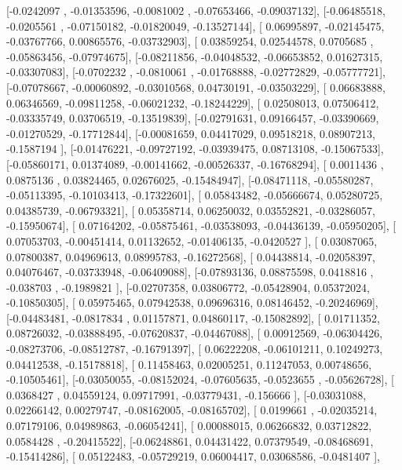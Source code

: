 \documentclass{article}
\begin{document}
       [-0.0242097 , -0.01353596, -0.0081002 , -0.07653466, -0.09037132],
       [-0.06485518, -0.0205561 , -0.07150182, -0.01820049, -0.13527144],
       [ 0.06995897, -0.02145475, -0.03767766,  0.00865576, -0.03732903],
       [ 0.03859254,  0.02544578,  0.0705685 , -0.05863456, -0.07974675],
       [-0.08211856, -0.04048532, -0.06653852,  0.01627315, -0.03307083],
       [-0.0702232 , -0.0810061 , -0.01768888, -0.02772829, -0.05777721],
       [-0.07078667, -0.00060892, -0.03010568,  0.04730191, -0.03503229],
       [ 0.06683888,  0.06346569, -0.09811258, -0.06021232, -0.18244229],
       [ 0.02508013,  0.07506412, -0.03335749,  0.03706519, -0.13519839],
       [-0.02791631,  0.09166457, -0.03390669, -0.01270529, -0.17712844],
       [-0.00081659,  0.04417029,  0.09518218,  0.08907213, -0.1587194 ],
       [-0.01476221, -0.09727192, -0.03939475,  0.08713108, -0.15067533],
       [-0.05860171,  0.01374089, -0.00141662, -0.00526337, -0.16768294],
       [ 0.0011436 ,  0.0875136 ,  0.03824465,  0.02676025, -0.15484947],
       [-0.08471118, -0.05580287, -0.05113395, -0.10103413, -0.17322601],
       [ 0.05843482, -0.05666674,  0.05280725,  0.04385739, -0.06793321],
       [ 0.05358714,  0.06250032,  0.03552821, -0.03286057, -0.15950674],
       [ 0.07164202, -0.05875461, -0.03538093, -0.04436139, -0.05950205],
       [ 0.07053703, -0.00451414,  0.01132652, -0.01406135, -0.0420527 ],
       [ 0.03087065,  0.07800387,  0.04969613,  0.08995783, -0.16272568],
       [ 0.04438814, -0.02058397,  0.04076467, -0.03733948, -0.06409088],
       [-0.07893136,  0.08875598,  0.0418816 , -0.038703  , -0.1989821 ],
       [-0.02707358,  0.03806772, -0.05428904,  0.05372024, -0.10850305],
       [ 0.05975465,  0.07942538,  0.09696316,  0.08146452, -0.20246969],
       [-0.04483481, -0.0817834 ,  0.01157871,  0.04860117, -0.15082892],
       [ 0.01711352,  0.08726032, -0.03888495, -0.07620837, -0.04467088],
       [ 0.00912569, -0.06304426, -0.08273706, -0.08512787, -0.16791397],
       [ 0.06222208, -0.06101211,  0.10249273,  0.04412538, -0.15178818],
       [ 0.11458463,  0.02005251,  0.11247053,  0.00748656, -0.10505461],
       [-0.03050055, -0.08152024, -0.07605635, -0.0523655 , -0.05626728],
       [ 0.0368427 ,  0.04559124,  0.09717991, -0.03779431, -0.156666  ],
       [-0.03031088,  0.02266142,  0.00279747, -0.08162005, -0.08165702],
       [ 0.0199661 , -0.02035214,  0.07179106,  0.04989863, -0.06054241],
       [ 0.00088015,  0.06266832,  0.03712822,  0.0584428 , -0.20415522],
       [-0.06248861,  0.04431422,  0.07379549, -0.08468691, -0.15414286],
       [ 0.05122483, -0.05729219,  0.06004417,  0.03068586, -0.0481407 ],
\end{document}
